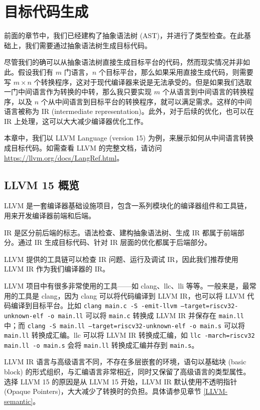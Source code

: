 \chapter{目标代码生成}

前面的章节中，我们已经建构了抽象语法树 (AST)，并进行了类型检查。在此基础上，我们需要通过抽象语法树生成目标代码。

尽管我们的确可以从抽象语法树直接生成目标平台的代码，然而现实情况并非如此。假设我们有
$m$ 门语言，$n$ 个目标平台，那么如果采用直接生成代码，则需要写 $m\times n$
个转换程序，这对于现代编译器来说是无法承受的。但是如果我们选取一门中间语言作为转换的中转，那么我只要实现
$m$ 个从语言到中间语言的转换程序，以及 $n$ 个从中间语言到目标平台的转换程序，就可以满足需求。这样的中间语言被称为
IR (intermediate representation)。此外，对于后续的优化，也可以在 IR 上处理，这可以大大减少编译器优化工作。

本章中，我们以 LLVM Language (version 15) 为例，来展示如何从中间语言转换成目标代码。如需查看
LLVM 的完整文档，请访问 \url{https://llvm.org/docs/LangRef.html}。

\section{LLVM 15 概览}

LLVM 是一套编译器基础设施项目，包含一系列模块化的编译器组件和工具链，用来开发编译器前端和后端。

IR 是区分前后端的标志。语法检查、建构抽象语法树、生成 IR 都属于前端部分。通过 IR
生成目标代码、针对 IR 层面的优化都属于后端部分。

LLVM 提供的工具链可以检查 IR 问题、运行及调试 IR，因此我们推荐使用 LLVM IR
作为我们编译器的 IR。

LLVM 项目中有很多非常使用的工具——如 clang、llc、lli 等等。一般来是，最常用的工具是
clang，因为 clang 可以将代码编译到 LLVM IR，也可以将 LLVM 代码编译到目标平台。比如
\texttt{clang main.c -S -emit-llvm --target=riscv32-unknown-elf -o main.ll}
可以将 \texttt{main.c} 转换成 LLVM IR 并保存在 \texttt{main.ll} 中；而
\texttt{clang -S main.ll --target=riscv32-unknown-elf -o main.s}
可以将 \texttt{main.ll} 转换成汇编。llc 可以将 LLVM IR 转换成汇编，如
\texttt{llc -march=riscv32 main.ll -o main.s} 会将 \texttt{main.ll}
转换成汇编并存到 \texttt{main.s}。

LLVM IR 语言与高级语言不同，不存在多层嵌套的环境，语句以基础块 (basic block)
的形式组织，与汇编语言非常相近，同时又保留了高级语言的类型属性。选择 LLVM 15
的原因是从 LLVM 15 开始，LLVM IR 默认使用不透明指针
(Opaque Pointers)，大大减少了转换时的负担。具体请参见章节 \ref{LLVM-semantic}。

